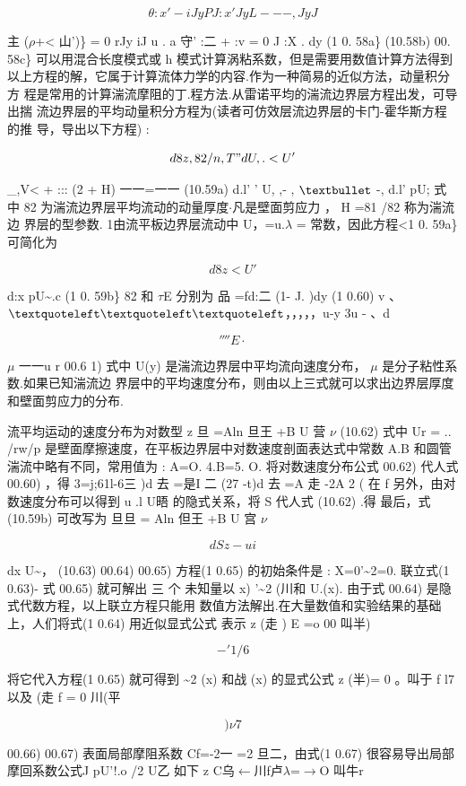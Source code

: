 \[\theta  :x ' - iJ y P J:x ' JyL - - -, JyJ\]

主 ($\rho$+< 山')\} = 0 rJy iJ u . a 守' :二 + :v = 0 J :X . dy (1 0. 58a\} (10.58b) 00. 58c\} 可以用混合长度模式或 h 模式计算涡粘系数，但是需要用数值计算方法得到 以上方程的解，它属于计算流体力学的内容.作为一种简易的近似方法，动量积分方 程是常用的计算湍流摩阻的丁.程方法.从雷诺平均的湍流边界层方程出发，可导出揣 流边界层的平均动量积分方程为(读者可仿效层流边界层的卡门-霍华斯方程的推 导，导出以下方程) :

\[d8z , 82 / n , T" dU,. < U'\]

\_,V< + ::: (2 + H) 一一=一一 (10.59a) d.l' ' U, ,- , ${\rm •}$ -, d.l' pU; 式中 82 为湍流边界层平均流动的动量厚度$\cdot $凡是壁面剪应力 ， H =81 /82 称为湍流边 界层的型参数. 1由流平板边界层流动中 U，=u.$\lambda$ = 常数，因此方程<1 0. 59a\} 可简化为

\[d8z <U'\]

d:x pU\textasciitilde{}.c (1 0. 59b\} 82 和 $\tau$E 分别为 品 =fd:二 (1- J. )dy (1 0.60) v 、${\rm ‘‘‘}$，，，，，u-y 3u - 、d

\[''''E\cdot \]

$\mu$ 一一u r 00.6 1) 式中 U(y) 是湍流边界层中平均流向速度分布， $\mu$ 是分子粘性系数.如果已知湍流边 界层中的平均速度分布，则由以上三式就可以求出边界层厚度和壁面剪应力的分布.

流平均运动的速度分布为对数型 z 旦 =Aln 旦王 +B U 营 $\nu$ (10.62) 式中 Ur = .. /rw/p 是壁面摩擦速度，在平板边界层中对数速度剖面表达式中常数 A.B 和圆管湍流中略有不同，常用值为 : A=O. 4.B=5. O. 将对数速度分布公式 00.62) 代人式 00.60) ，得 3=j;61l-6三 )d 去 =是I 二 (27 -t)d 去 =A 走 -2A 2 ( 在 f 另外，由对数速度分布可以得到 u .l U晤 的隐式关系，将 S 代人式 (10.62) .得 最后，式 (10.59b) 可改写为 旦旦 = Aln 但王 +B U 宫 $\nu$

\[dSz -ui\]

dx U\textasciitilde{}， (10.63) 00.64) 00.65) 方程(1 0.65) 的初始条件是 : X=0'\textasciitilde{}2=0. 联立式(1 0.63)- 式 00.65) 就可解出 三 个 未知量以 x) '\textasciitilde{}2 (川和 U.(x). 由于式 00.64) 是隐式代数方程，以上联立方程只能用 数值方法解出.在大量数值和实验结果的基础上，人们将式(1 0.64) 用近似显式公式 表示 z (走 ) E =o 00 叫半)

\[-'1/6\]

将它代入方程(1 0.65) 就可得到 \textasciitilde{}2 (x) 和战 (x) 的显式公式 z (半)= 0 。叫于 f l7 以及 (走 f = 0 川(平

\[)\nu 7\]

00.66) 00.67) 表面局部摩阻系数 Cf=-2一 =2 旦二，由式(1 0.67) 很容易导出局部摩回系数公式J pU'!.o /2 U乙 如下 z C乌$\leftarrow$川f卢$\lambda$=$\rightarrow$O 叫牛r


